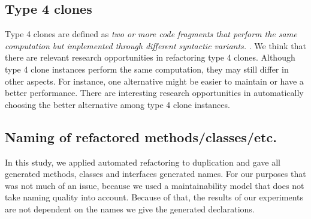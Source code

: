 

\subsection{Type 4 clones}
Type 4 clones are defined as \textit{two or more code fragments that perform the same computation but implemented through different syntactic variants.} \cite{roy2007survey}. We think that there are relevant research opportunities in refactoring type 4 clones. Although type 4 clone instances perform the same computation, they may still differ in other aspects. For instance, one alternative might be easier to maintain or have a better performance. There are interesting research opportunities in automatically choosing the better alternative among type 4 clone instances.


\subsection{Naming of refactored methods/classes/etc.}
In this study, we applied automated refactoring to duplication and gave all generated methods, classes and interfaces generated names. For our purposes that was not much of an issue, because we used a maintainability model \cite{heitlager2007practical} that does not take naming quality into account. Because of that, the results of our experiments are not dependent on the names we give the generated declarations.

